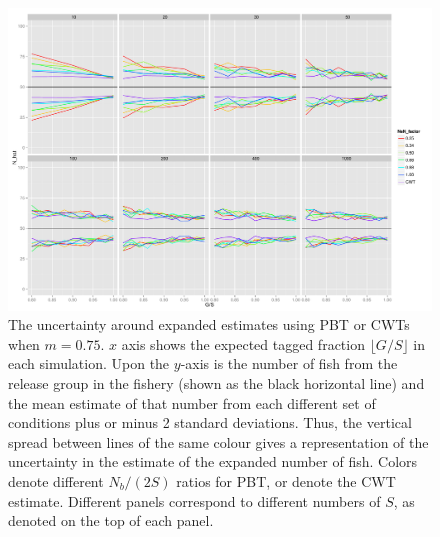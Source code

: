 \documentclass[11pt]{article}
\begin{document}
\begin{figure}
\includegraphics[width = .93\textwidth]{./images/sd_line_horns_m_0_75.pdf}
\caption{The uncertainty around expanded estimates using PBT or CWTs when $m = 0.75$.  $x$ axis shows the
expected tagged fraction $\lfloor G/S \rfloor$ in each simulation. Upon the $y$-axis is the number of fish from the
release group in the fishery (shown as the black horizontal line) and the mean estimate of that number from each different set of 
conditions plus or minus 2 standard deviations.  Thus, the vertical spread between lines of the same colour gives a representation
of the uncertainty in the estimate of the expanded number of fish. Colors denote different $N_b/(2S)$ ratios for PBT, or denote
the CWT estimate.  Different
panels correspond to different numbers of $S$, as denoted on the top of each panel.
\label{fig:horn0.75}}
\end{figure}
\end{document}
